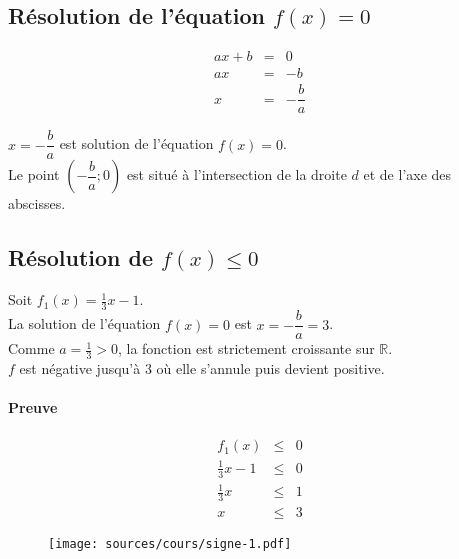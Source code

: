 \documentclass[paper=a4, fontsize=9pt]{scrartcl} %
\begin{document}
\subsection{Résolution de l'équation $f(x) = 0$}

\begin{multicols}{2}

  \begin{eqnarray*}
    a x + b &=& 0\\
    a x &=& -b\\
    x &=& -\dfrac{b}{a}
  \end{eqnarray*}

  $x = -\dfrac{b}{a}$ est solution de l'équation $f(x) = 0$. \\
  Le point $(-\dfrac{b}{a} ; 0)$ est situé à l'intersection de la droite $d$ et de l'axe des abscisses.

\end{multicols}

\subsection{Résolution de $f(x) \leq 0$}

\begin{multicols}{2}
  \begin{Proposition}
    Soit $f_1(x) = \frac{1}{3} x - 1$.\\
    La solution de l'équation $f(x) = 0$ est $x = -\dfrac{b}{a} = 3$.\\
    Comme $a = \frac{1}{3} > 0$, la fonction est strictement croissante sur $\mathbb{R}$.\\ 
    $f$ est négative jusqu'à 3 où elle s'annule puis devient positive.
  \end{Proposition}

  \paragraph{Preuve}

  \begin{eqnarray*}
    f_1(x) & \leq & 0\\
    \frac{1}{3} x - 1 & \leq & 0 \\
    \frac{1}{3} x & \leq & 1 \\
    x & \leq & 3
  \end{eqnarray*}



  \begin{figure}[H]
    \centering
    \texttt{[image: sources/cours/signe-1.pdf]}
  \end{figure}

\end{multicols}
\end{document}
